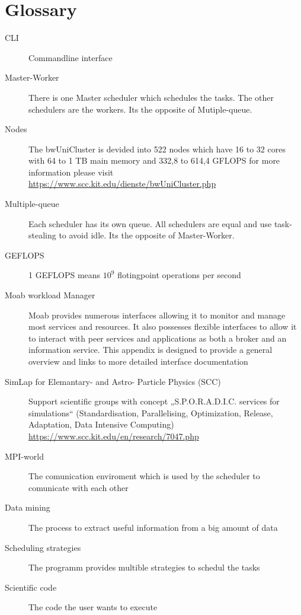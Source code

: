 \section{Glossary}
\begin{description}
	\item[CLI] Commandline interface
	
	\item[Master-Worker] There is one Master scheduler which schedules the tasks. The other schedulers are the workers. Its the opposite of Mutiple-queue.

	\item[Nodes] The bwUniCluster is devided into 522 nodes which have 16 to 32 cores with 64 to 1 TB main memory and 332,8 to 614,4 GFLOPS for more information please visit \href{https://www.scc.kit.edu/dienste/bwUniCluster.php}{https://www.scc.kit.edu/dienste/bwUniCluster.php}

	\item[Multiple-queue]Each scheduler has its own queue. All schedulers are equal and use task-stealing to avoid idle. Its the opposite of Master-Worker.

	\item[GEFLOPS] 1 GEFLOPS means $10^9$ flotingpoint operations per second

	\item[Moab workload Manager] Moab provides numerous interfaces allowing it to monitor and manage most services and resources. It also possesses flexible interfaces to allow it to interact with peer services and applications as both a broker and an information service. This appendix is designed to provide a general overview and links to more detailed interface documentation

	\item [SimLap for Elemantary- and Astro-    Particle Physics (SCC)] Support scientific groups with concept „S.P.O.R.A.D.I.C. services for simulations“ (Standardisation, Parallelising, Optimization, Release, Adaptation, Data Intensive Computing) \href {https://www.scc.kit.edu/en/research/7047.php}{https://www.scc.kit.edu/en/research/7047.php}

	\item[MPI-world] The comunication enviroment which is used by the scheduler to comunicate with each other 

	\item[Data mining] The process to extract useful information from a big amount of data

	\item[Scheduling strategies] The programm provides multible strategies to schedul the tasks

	\item[Scientific code] The code the user wants to execute
\end{description}